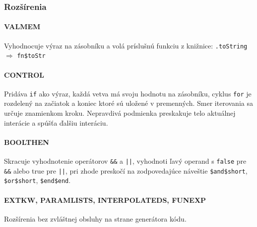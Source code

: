 \documentclass{article}
\begin{document}
        \subsubsection{Rozšírenia}
        \paragraph{VALMEM}
            Vyhodnocuje výraz na zásobníku a volá príslušnú funkciu z knižnice: \texttt{.toString} $\Rightarrow$ \texttt{fn\$toStr}
        \paragraph{CONTROL}
            Pridáva \texttt{if} ako výraz, každá vetva má svoju hodnotu na zásobníku, cyklus \texttt{for} je rozdelený na začiatok a koniec ktoré sú uložené v premenných. Smer iterovania sa určuje znamienkom kroku. Nepravdivá podmienka preskakuje telo aktuálnej interácie a spúšťa ďalšiu interáciu.
        \paragraph{BOOLTHEN}
            Skracuje vyhodnotenie operátorov \texttt{\&\&} a \texttt{||}, vyhodnoti ľavý operand s \texttt{false} pre \texttt{\&\&} alebo true pre \texttt{||}, pri zhode preskočí na zodpovedajúce náveštie \texttt{\$and\$short}, \texttt{\$or\$short}, \texttt{\$end\$end}.
        \paragraph{EXTKW, PARAMLISTS, INTERPOLATEDS, FUNEXP} Rozšírenia bez zvláštnej obsluhy na strane generátora kódu.
\end{document}
